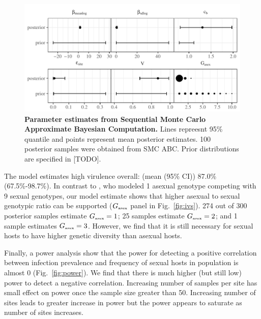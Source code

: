 \documentclass{article}\usepackage[]{graphicx}\usepackage[]{color}
\newcommand{\fref}[1]{Fig.~\ref{fig:#1}}
\begin{document}
\begin{figure}[!ht]
\includegraphics[width=\textwidth]{../fig/verg_post.pdf}
\caption{{\bf Parameter estimates from Sequential Monte Carlo Approximate Bayesian Computation.}
Lines repreesnt 95\% quantile and points represent mean posterior estimates. 100 posterior samples were obtained from SMC ABC. Prior distributions are specified in [TODO].
}
\label{fig:smcparam}
\end{figure}

The model estimates high virulence overall: (mean (95\% CI)) 87.0\% (67.5\%-98.7\%).
In contrast to \cite{lively2010epidemiological}, who modeled 1 asexual genotype competing with 9 sexual genotypes, our model estimate shows that higher asexual to sexual genotypic ratio can be supported ($G_{\textrm{\tiny asex}}$ panel in \fref{ivs}).
274 out of 300 posterior samples estimate $G_{\textrm{\tiny asex}} = 1$; 25 samples estimate $G_{\textrm{\tiny asex}} = 2$; and 1 sample estimates $G_{\textrm{\tiny asex}} = 3$.
However, we find that it is still necessary for sexual hosts to have higher genetic diversity than asexual hosts.

Finally, a power analysis show that the power for detecting a positive correlation between infection prevalence and frequency of sexual hosts in \cite{vergara2014infection} population is almost 0 (\fref{power}).
We find that there is much higher (but still low) power to detect a negative correlation.
Increasing number of samples per site has small effect on power once the sample size greater than 50.
Increasing number of sites leads to greater increase in power but the power appears to saturate as number of sites increases.
\end{document}
